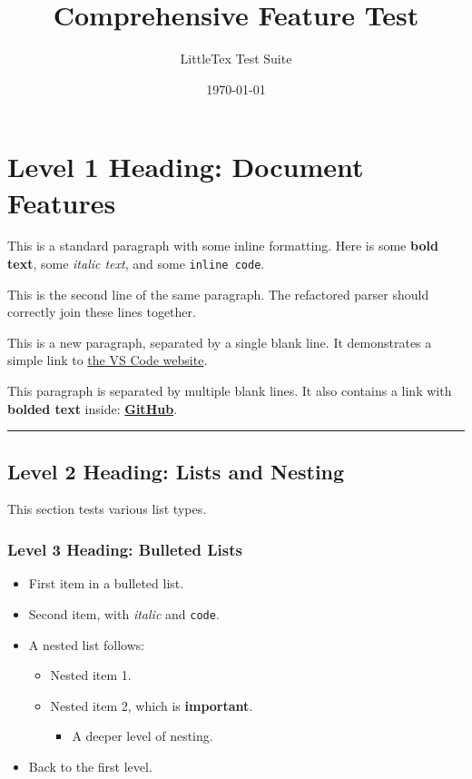 \documentclass{article}
\title{\textbf{Comprehensive Feature Test}}
\author{LittleTex Test Suite}
\date{\today}
\begin{document}
\maketitle


\section{Level 1 Heading: Document Features}


This is a standard paragraph with some inline formatting. Here is some \textbf{bold text}, some \textit{italic text}, and some \texttt{inline code}.

This is the second line of the same paragraph. The refactored parser should correctly join these lines together.

This is a new paragraph, separated by a single blank line. It demonstrates a simple link to \href{https://code.visualstudio.com/}{the VS Code website}.

This paragraph is separated by multiple blank lines.
It also contains a link with \textbf{bolded text} inside: \href{https://github.com}{\textbf{GitHub}}.

\vspace{0.3cm}
\noindent\hrule
\vspace{0.3cm}

\subsection{Level 2 Heading: Lists and Nesting}


This section tests various list types.

\subsubsection{Level 3 Heading: Bulleted Lists}


\begin{itemize}
\item First item in a bulleted list.
\item Second item, with \textit{italic} and \texttt{code}.
\item A nested list follows:
\begin{itemize}
\item Nested item 1.
\item Nested item 2, which is \textbf{important}.
\begin{itemize}
\item A deeper level of nesting.
\end{itemize}

\end{itemize}

\item Back to the first level.
\end{itemize}
\end{document}
